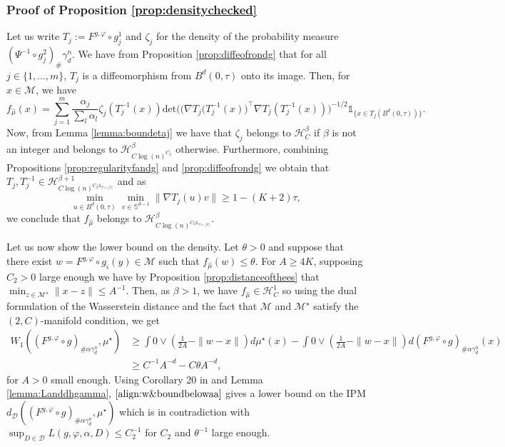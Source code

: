 \documentclass[10pt]{article}
\begin{document}
\subsubsection{Proof of Proposition \ref{prop:densitychecked}}\label{sec:prop:densitychecked}
Let us write $T_j:=F^{g,\varphi}\circ g_j^1$ and $\zeta_j$ for the density of the probability measure $(\Psi^{-1}\circ g_j^2)_{\#} \gamma_d^n$. We have from Proposition \ref{prop:diffeofrondg} that for all $j\in \{1,...,m\}$, $T_j$ is a diffeomorphism from $B^d(0,\tau)$ onto its image. Then, for $x\in \mathcal{M}$, we have 
\begin{equation}
    f_{\hat{\mu}}(x)=\sum_{j=1}^m \frac{\alpha_j}{\sum_{l} \alpha_l} \zeta_j(T_j^{-1}(x))\text{det}\Big(\big(\nabla T_j(T_j^{-1}(x)\big)^\top\nabla T_j(T_j^{-1}(x))\Big)^{-1/2}\mathds{1}_{\{x\in T_j(B^d(0,\tau))\}}.
\end{equation}
Now, from Lemma \ref{lemma:boundetaj} we have that $\zeta_j$ belongs to $\mathcal{H}^{\beta}_C$ if $\beta$ is not an integer and belongs to $\mathcal{H}^{\beta}_{C\log(n)^{C_2}}$ otherwise. Furthermore,  combining Propositions \ref{prop:regularityfandg} and \ref{prop:diffeofrondg} we obtain that $T_j,T_j^{-1}\in \mathcal{H}^{\beta+1}_{C\log(n)^{C_2\mathds{1}_{\beta=\lfloor \beta \rfloor}}}$ and as 
$$\min_{u\in B^d(0,\tau)}\min_{v\in \mathbb{S}^{d-1}} \|\nabla T_j(u)v\|\geq 1-(K+2)\tau,$$
we conclude that $f_{\hat{\mu}}$ belongs to $\mathcal{H}^{\beta}_{C\log(n)^{C_2\mathds{1}_{\beta=\lfloor \beta \rfloor}}}$.

Let us now show the lower bound on the density. Let $\theta>0$ and suppose that there exist $w=F^{g,\varphi}\circ g_i(y)\in \mathcal{M}$ such that $f_{\hat{\mu}}(w)\leq \theta$. For $A\geq 4K$, supposing $C_2>0$ large enough we have by Proposition \ref{prop:distanceofthees} that $\min_{z\in \mathcal{M}^\star} \|x-z\|\leq A^{-1}.$ Then, as $\beta>1$, we have $f_{\hat{\mu}}\in \mathcal{H}^1_C$ so using the dual formulation of the Wasserstein distance and the fact that $\mathcal{M}$ and $\mathcal{M}^\star$ satisfy the $(2,C)$-manifold condition, we get
\begin{align}\label{align:w&boundbelowaa}
W_1((F^{g,\varphi}\circ g)_{\# \alpha \gamma_d^n},\mu^\star) & \geq \int 0\vee (\frac{1}{2A}-\|w-x\|)d\mu^\star(x)-\int 0\vee (\frac{1}{2A}-\|w-x\|)d(F^{g,\varphi}\circ g)_{\# \alpha \gamma_d^n}(x)\nonumber\\
    & \geq C^{-1}A^{-d}-C\theta A^{-d},
\end{align}
for $A>0$ small enough.
Using Corollary 20 in \cite{stephanovitch2024ipm} and Lemma \ref{lemma:Landdhgamma}, $\eqref{align:w&boundbelowaa}$ gives a lower bound on the IPM $d_{\mathcal{D}}((F^{g,\varphi}\circ g)_{\# \alpha \gamma_d^n},\mu^\star)$
which is in contradiction with $\sup_{D\in \mathcal{D}} L(g,\varphi,\alpha,D)\leq C_2^{-1}$ for $C_2$ and $\theta^{-1}$ large enough.
\end{document}

